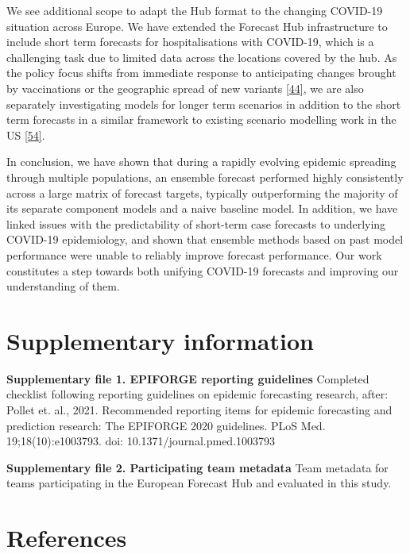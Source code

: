 \documentclass[
]{article}
\begin{document}
We see additional scope to adapt the Hub format to the changing COVID-19 situation across Europe. We have extended the Forecast Hub infrastructure to include short term forecasts for hospitalisations with COVID-19, which is a challenging task due to limited data across the locations covered by the hub. As the policy focus shifts from immediate response to anticipating changes brought by vaccinations or the geographic spread of new variants \protect\hyperlink{ref-europeancentrefordiseasepreventionandcontrolOverviewImplementationCOVID192021}{{[}44{]}}, we are also separately investigating models for longer term scenarios in addition to the short term forecasts in a similar framework to existing scenario modelling work in the US \protect\hyperlink{ref-borcheringModelingFutureCOVID192021}{{[}54{]}}.

In conclusion, we have shown that during a rapidly evolving epidemic spreading through multiple populations, an ensemble forecast performed highly consistently across a large matrix of forecast targets, typically outperforming the majority of its separate component models and a naive baseline model. In addition, we have linked issues with the predictability of short-term case forecasts to underlying COVID-19 epidemiology, and shown that ensemble methods based on past model performance were unable to reliably improve forecast performance. Our work constitutes a step towards both unifying COVID-19 forecasts and improving our understanding of them.

\hypertarget{supplementary-information}{%
\section{Supplementary information}\label{supplementary-information}}

\textbf{Supplementary file 1. EPIFORGE reporting guidelines}
Completed checklist following reporting guidelines on epidemic forecasting research, after: Pollet et. al., 2021. Recommended reporting items for epidemic forecasting and prediction research: The EPIFORGE 2020 guidelines. PLoS Med. 19;18(10):e1003793. doi: 10.1371/journal.pmed.1003793

\textbf{Supplementary file 2. Participating team metadata}
Team metadata for teams participating in the European Forecast Hub and evaluated in this study.

\hypertarget{references}{%
\section{References}\label{references}}
\end{document}
